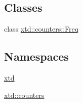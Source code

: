 \subsection*{Classes}
\begin{DoxyCompactItemize}
\item 
class \hyperlink{classxtd_1_1counters_1_1Freq}{xtd\-::counters\-::\-Freq}
\end{DoxyCompactItemize}
\subsection*{Namespaces}
\begin{DoxyCompactItemize}
\item 
\hyperlink{namespacextd}{xtd}
\item 
\hyperlink{namespacextd_1_1counters}{xtd\-::counters}
\end{DoxyCompactItemize}
